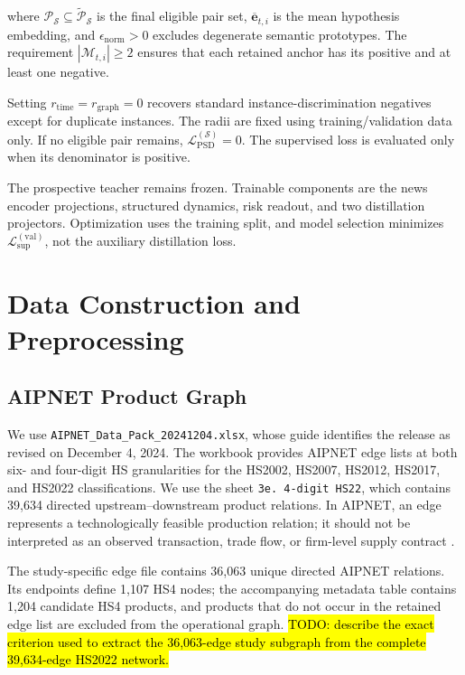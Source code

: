 \documentclass[letterpaper]{article} %
\begin{document}
where \(\mathcal P_{\mathcal S}\subseteq\widetilde{\mathcal P}_{\mathcal S}\) is the final eligible pair set, \(\overline{\mathbf e}_{t,i}\) is the mean hypothesis embedding, and \(\epsilon_{\mathrm{norm}}>0\) excludes degenerate semantic prototypes. The requirement \(|\mathcal M_{t,i}|\geq2\) ensures that each retained anchor has its positive and at least one negative.

Setting \(r_{\mathrm{time}}=r_{\mathrm{graph}}=0\) recovers standard instance-discrimination negatives except for duplicate instances. The radii are fixed using training/validation data only. If no eligible pair remains, \(\mathcal L_{\mathrm{PSD}}^{(\mathcal S)}=0\). The supervised loss is evaluated only when its denominator is positive.

The prospective teacher remains frozen. Trainable components are the news encoder projections, structured dynamics, risk readout, and two distillation projectors. Optimization uses the training split, and model selection minimizes \(\mathcal L_{\mathrm{sup}}^{(\mathrm{val})}\), not the auxiliary distillation loss.

\section{Data Construction and Preprocessing}
\label{app:data}

\subsection{AIPNET Product Graph}

We use \texttt{AIPNET\_Data\_Pack\_20241204.xlsx}, whose guide identifies the release as revised on December 4, 2024. The workbook provides AIPNET edge lists at both six- and four-digit HS granularities for the HS2002, HS2007, HS2012, HS2017, and HS2022 classifications. We use the sheet \texttt{3e. 4-digit HS22}, which contains 39,634 directed upstream--downstream product relations. In AIPNET, an edge represents a technologically feasible production relation; it should not be interpreted as an observed transaction, trade flow, or firm-level supply contract \cite{fetzer2024ai}.

The study-specific edge file contains 36,063 unique directed AIPNET relations. Its endpoints define 1,107 HS4 nodes; the accompanying metadata table contains 1,204 candidate HS4 products, and products that do not occur in the retained edge list are excluded from the operational graph. \hl{TODO: describe the exact criterion used to extract the 36,063-edge study subgraph from the complete 39,634-edge HS2022 network.}
\end{document}

